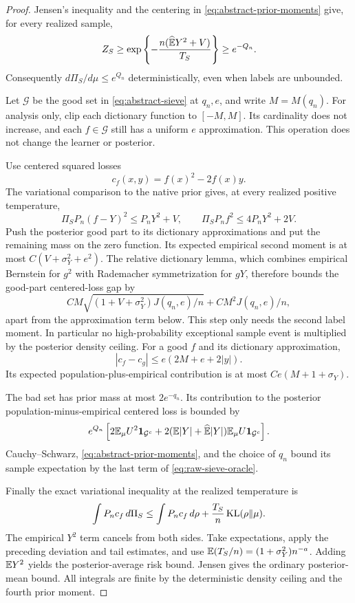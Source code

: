 \begin{proof}
Jensen's inequality and the centering in
\eqref{eq:abstract-prior-moments} give, for every realized sample,
\[
 Z_S\ge\exp\left\{-\frac{n(\widehat{\mathbb E}Y^2+V)}{T_S}\right\}
       \ge e^{-Q_n}.
\]
Consequently $d\Pi_S/d\mu\le e^{Q_n}$ deterministically, even when
labels are unbounded.

Let $\mathcal G$ be the good set in \eqref{eq:abstract-sieve} at
$q_n,e$, and write $M=M(q_n)$. For analysis only, clip each dictionary
function to $[-M,M]$. Its cardinality does not increase, and each
$f\in\mathcal G$ still has a uniform $e$ approximation. This operation
does not change the learner or posterior.

Use centered squared losses
\[
 c_f(x,y)=f(x)^2-2f(x)y.
\]
The variational comparison to the native prior gives, at every realized
positive temperature,
\[
 \Pi_S P_n(f-Y)^2\le P_nY^2+V,
 \qquad \Pi_S P_nf^2\le4P_nY^2+2V.
\]
Push the posterior good part to its dictionary approximations and put
the remaining mass on the zero function. Its expected empirical second
moment is at most $C(V+\sigma_Y^2+e^2)$. The relative dictionary lemma,
which combines empirical Bernstein for $g^2$ with Rademacher
symmetrization for $gY$, therefore bounds the good-part centered-loss
gap by
\[
 C M\sqrt{(1+V+\sigma_Y^2)J(q_n,e)/n}
       +CM^2J(q_n,e)/n,
\]
apart from the approximation term below. This step only needs the
second label moment. In particular no high-probability exceptional
sample event is multiplied by the posterior density ceiling.
For a good $f$ and its dictionary approximation,
\[
 |c_f-c_g|\le e(2M+e+2|y|).
\]
Its expected population-plus-empirical contribution is at most
$Ce(M+1+\sigma_Y)$.

The bad set has prior mass at most $2e^{-q_n}$. Its contribution to
the posterior population-minus-empirical centered loss is bounded by
\[
 e^{Q_n}\left[2\mathbb E_\mu U^2\mathbf1_{\mathcal G^c}
 +2(\mathbb E|Y|+\widehat{\mathbb E}|Y|)
                \mathbb E_\mu U\mathbf1_{\mathcal G^c}\right].
\]
Cauchy--Schwarz, \eqref{eq:abstract-prior-moments}, and the choice of
$q_n$ bound its sample expectation by the last term of
\eqref{eq:raw-sieve-oracle}.

Finally the exact variational inequality at the realized temperature is
\[
 \int P_n c_f\,d\Pi_S
 \le\int P_n c_f\,d\rho+\frac{T_S}{n}\operatorname{KL}(\rho\Vert\mu).
\]
The empirical $Y^2$ term cancels from both sides. Take expectations,
apply the preceding deviation and tail estimates, and use
$\mathbb E(T_S/n)=(1+\sigma_Y^2)n^{-a}$. Adding $\mathbb E Y^2$ yields the
posterior-average risk bound. Jensen gives the ordinary posterior-mean
bound. All integrals are finite by the deterministic density ceiling
and the fourth prior moment.
\end{proof}
